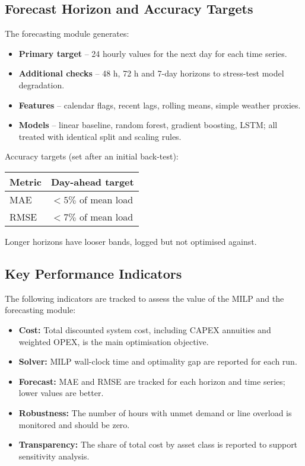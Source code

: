 \subsection{Forecast Horizon and Accuracy Targets}

The forecasting module generates:
\begin{itemize}
    \item \textbf{Primary target} -- 24 hourly values for the next day for each time series.
    \item \textbf{Additional checks} -- 48 h, 72 h and 7-day horizons to stress-test model degradation.
    \item \textbf{Features} -- calendar flags, recent lags, rolling means, simple weather proxies.
    \item \textbf{Models} -- linear baseline, random forest, gradient boosting, LSTM; all treated with identical split and scaling rules.
\end{itemize}

Accuracy targets (set after an initial back-test):

\begin{center}
\begin{tabular}{ll}
\textbf{Metric} & \textbf{Day-ahead target} \\
\hline
MAE & $< 5\%$ of mean load \\
RMSE & $< 7\%$ of mean load \\
\end{tabular}
\end{center}

Longer horizons have looser bands, logged but not optimised against.

\subsection{Key Performance Indicators}

The following indicators are tracked to assess the value of the MILP and the forecasting module:
\begin{itemize}
    \item \textbf{Cost:} Total discounted system cost, including CAPEX annuities and weighted OPEX, is the main optimisation objective.
    \item \textbf{Solver:} MILP wall-clock time and optimality gap are reported for each run.
    \item \textbf{Forecast:} MAE and RMSE are tracked for each horizon and time series; lower values are better.
    \item \textbf{Robustness:} The number of hours with unmet demand or line overload is monitored and should be zero.
    \item \textbf{Transparency:} The share of total cost by asset class is reported to support sensitivity analysis.
\end{itemize}

